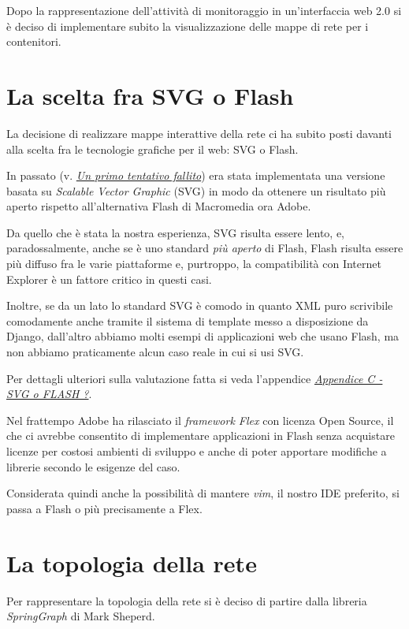 \documentclass[a4wide,10pt,italian]{manual}
\begin{document}
Dopo la rappresentazione dell'attività di monitoraggio in un'interfaccia web 2.0 si è deciso di implementare
subito la visualizzazione delle mappe di rete per i contenitori.


\section{La scelta fra SVG o Flash}

La decisione di realizzare mappe interattive della rete ci ha subito posti
davanti alla scelta fra le tecnologie grafiche per il web: SVG o Flash.

In passato (v. \hyperlink{first-attempt-failed}{\emph{Un primo tentativo fallito}})
era stata implementata una versione basata su \emph{Scalable Vector Graphic} (SVG) in modo da ottenere
un risultato più aperto rispetto all'alternativa Flash di Macromedia ora Adobe.

Da quello che è stata la nostra esperienza, SVG risulta essere lento, e,
paradossalmente, anche se è uno standard \emph{più aperto} di Flash, Flash risulta essere più
diffuso fra le varie piattaforme e, purtroppo, la compatibilità con Internet Explorer è un fattore
critico in questi casi.

Inoltre, se da un lato lo standard SVG è comodo in quanto XML puro scrivibile comodamente anche tramite
il sistema di template messo a disposizione da Django, dall'altro
abbiamo molti esempi di applicazioni web che usano Flash,
ma non abbiamo praticamente alcun caso reale in cui si usi SVG.

Per dettagli ulteriori sulla valutazione fatta si veda l'appendice \hyperlink{svg-or-flash}{\emph{Appendice C - SVG o FLASH ?}}.

Nel frattempo Adobe ha rilasciato il \emph{framework Flex} con licenza Open Source,
il che ci avrebbe consentito di implementare applicazioni in Flash senza acquistare
licenze per costosi ambienti di sviluppo e
anche di poter apportare modifiche a librerie secondo le esigenze del caso.

Considerata quindi anche la possibilità di mantere \emph{vim}, il nostro IDE preferito,
si passa a Flash o più precisamente a Flex.


\section{La topologia della rete}

Per rappresentare la topologia della rete si è deciso di partire dalla libreria \emph{SpringGraph} di Mark Sheperd.
\end{document}
